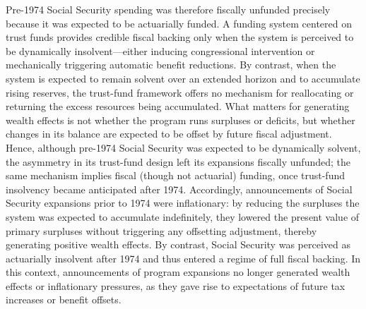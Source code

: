 \documentclass[12pt]{article}%
\theoremstyle{remark}
\begin{document}
Pre-1974 Social Security spending was therefore fiscally unfunded precisely because it was expected to be actuarially funded. A funding system centered on trust funds provides credible fiscal backing only when the system is perceived to be dynamically insolvent—either inducing congressional intervention or mechanically triggering automatic benefit reductions. By contrast, when the system is expected to remain solvent over an extended horizon and to accumulate rising reserves, the trust-fund framework offers no mechanism for reallocating or returning the excess resources being accumulated. What matters for generating wealth effects is not whether the program runs surpluses or deficits, but whether changes in its balance are expected to be offset by future fiscal adjustment. Hence, although pre-1974 Social Security was expected to be dynamically solvent, the asymmetry in its trust-fund design left its expansions fiscally unfunded; the same mechanism implies fiscal (though not actuarial) funding, once trust-fund insolvency became anticipated after 1974.
Accordingly, announcements of Social Security expansions prior to 1974 were inflationary: by reducing the surpluses the system was expected to accumulate indefinitely, they lowered the present value of primary surpluses without triggering any offsetting adjustment, thereby generating positive wealth effects. By contrast, Social Security was perceived as actuarially insolvent after 1974 and thus entered a regime of full fiscal backing. In this context, announcements of program expansions no longer generated wealth effects or inflationary pressures, as they gave rise to expectations of future tax increases or benefit offsets.
\end{document}

